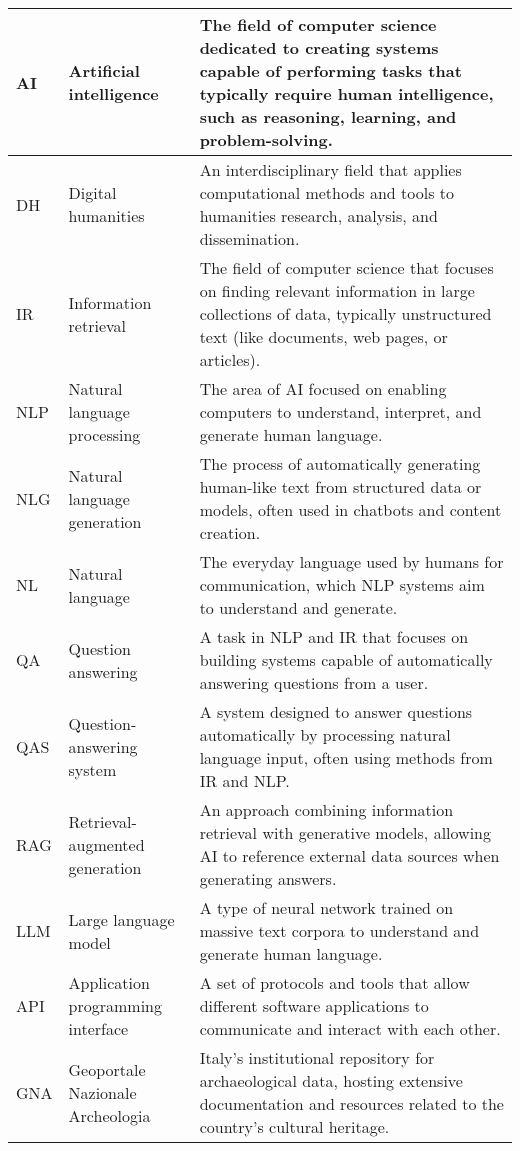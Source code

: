 \begin{tabularx}{\textwidth}{
  >{\raggedright\arraybackslash}p{2.5cm}
  >{\raggedright\arraybackslash}p{4cm}
  >{\noindent\justifying\arraybackslash}X
}
AI    & Artificial intelligence & The field of computer science dedicated to creating systems capable of performing tasks that typically require human intelligence, such as reasoning, learning, and problem-solving. \\
\cmidrule(lr){1-3}
DH    & Digital humanities & An interdisciplinary field that applies computational methods and tools to humanities research, analysis, and dissemination. \\
\cmidrule(lr){1-3}
IR    & Information retrieval & The field of computer science that focuses on finding relevant information in large collections of data, typically unstructured text (like documents, web pages, or articles). \\
\cmidrule(lr){1-3}
NLP   & Natural language processing & The area of AI focused on enabling computers to understand, interpret, and generate human language. \\
\cmidrule(lr){1-3}
NLG   & Natural language generation & The process of automatically generating human-like text from structured data or models, often used in chatbots and content creation. \\
\cmidrule(lr){1-3}
NL & Natural language & The everyday language used by humans for communication, which NLP systems aim to understand and generate. \\
\cmidrule(lr){1-3}
QA    & Question answering & A task in NLP and IR that focuses on building systems capable of automatically answering questions from a user. \\
\cmidrule(lr){1-3}
QAS   & Question-answering system & A system designed to answer questions automatically by processing natural language input, often using methods from IR and NLP. \\
\cmidrule(lr){1-3}
RAG   & Retrieval-augmented generation & An approach combining information retrieval with generative models, allowing AI to reference external data sources when generating answers. \\
\cmidrule(lr){1-3}
LLM   & Large language model & A type of neural network trained on massive text corpora to understand and generate human language. \\
\cmidrule(lr){1-3}
API  & Application programming interface & A set of protocols and tools that allow different software applications to communicate and interact with each other. \\
\cmidrule(lr){1-3}
GNA   & Geoportale Nazionale Archeologia & Italy's institutional repository for archaeological data, hosting extensive documentation and resources related to the country's cultural heritage. \\

\end{tabularx}
